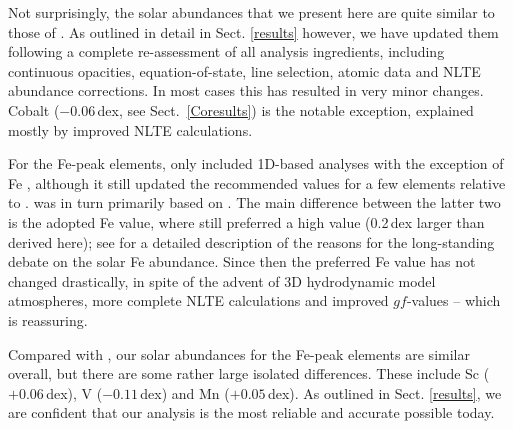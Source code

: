 \documentclass[traditabstract]{aa}
\begin{document}
Not surprisingly, the solar abundances that we present here are quite similar to those of .  As outlined in detail in Sect. \ref{results} however, we have updated them following a complete re-assessment of all analysis ingredients, including continuous opacities, equation-of-state, line selection, atomic data and NLTE abundance corrections. In most cases this has resulted in very minor changes.  Cobalt ($-0.06$\,dex, see Sect.~\ref{Coresults}) is the notable exception, explained mostly by improved NLTE calculations.

For the Fe-peak elements,  only included 1D-based analyses with the 
exception of Fe \citep{AspII}, although it still updated the recommended values for a few elements relative to .   was in turn primarily based on . The main difference between the latter two is the adopted Fe value, where  still preferred a high value (0.2\,dex larger than derived here); see \citet{GS99} for a detailed description of the reasons for the long-standing debate on the solar Fe abundance. Since then the preferred Fe value has not changed drastically, in spite of the advent of 3D hydrodynamic model atmospheres, more complete NLTE calculations and improved $gf$-values -- which is reassuring.

Compared with \citet{Lodders09}, our solar abundances for the Fe-peak elements are
similar overall, but there are some rather large isolated differences.  These include
Sc ($+0.06$\,dex), V ($-0.11$\,dex) and Mn ($+0.05$\,dex). As outlined in Sect. \ref{results},
we are confident that our analysis is the most reliable and accurate possible today. 
\end{document}
